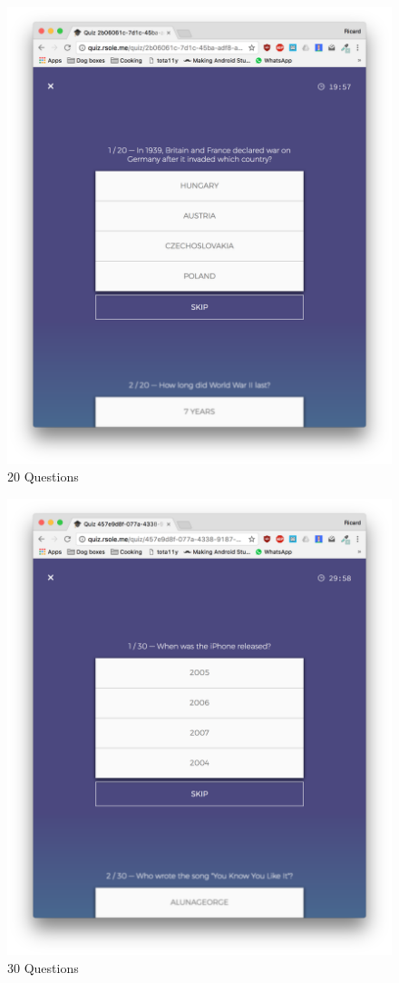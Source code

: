\documentclass[english,a4paper,]{report}
\begin{document}
\begin{figure}
\centering
\includegraphics{report/images/01.png}
\caption{20 Questions\label{fig:2}}
\end{figure}

\begin{figure}
\centering
\includegraphics{report/images/02.png}
\caption{30 Questions\label{fig:3}}
\end{figure}
\end{document}
